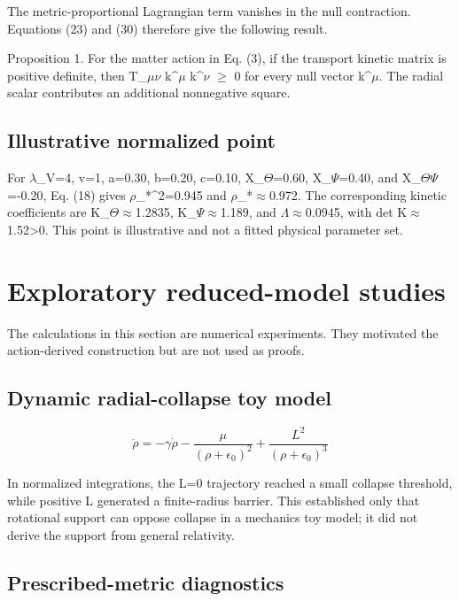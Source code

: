 \documentclass[aps,prd,preprint,nofootinbib,superscriptaddress]{revtex4-2}
\begin{document}
The metric-proportional Lagrangian term vanishes in the null contraction. Equations (23) and (30) therefore give the following result.


Proposition 1. For the matter action in Eq. (3), if the transport kinetic matrix is positive definite, then T\_$\mu$$\nu$ k\textasciicircum{}$\mu$ k\textasciicircum{}$\nu$ $\geq$ 0 for every null vector k\textasciicircum{}$\mu$. The radial scalar contributes an additional nonnegative square.


\subsection{Illustrative normalized point}

For $\lambda$\_V=4, v=1, a=0.30, b=0.20, c=0.10, X\_$\Theta$=0.60, X\_$\Psi$=0.40, and X\_$\Theta$$\Psi$=-0.20, Eq. (18) gives $\rho$\_*\textasciicircum{}2=0.945 and $\rho$\_*$\approx$0.972. The corresponding kinetic coefficients are K\_$\Theta$$\approx$1.2835, K\_$\Psi$$\approx$1.189, and $\Lambda$$\approx$0.0945, with det K$\approx$1.52>0. This point is illustrative and not a fitted physical parameter set.


\section{Exploratory reduced-model studies}

The calculations in this section are numerical experiments. They motivated the action-derived construction but are not used as proofs.


\subsection{Dynamic radial-collapse toy model}

\begin{equation}
\ddot\rho=-\gamma\dot\rho-\frac{\mu}{(\rho+\epsilon_0)^2}+\frac{L^2}{(\rho+\epsilon_0)^3}
\tag{31}\label{eq:31}
\end{equation}

In normalized integrations, the L=0 trajectory reached a small collapse threshold, while positive L generated a finite-radius barrier. This established only that rotational support can oppose collapse in a mechanics toy model; it did not derive the support from general relativity.


\subsection{Prescribed-metric diagnostics}
\end{document}
